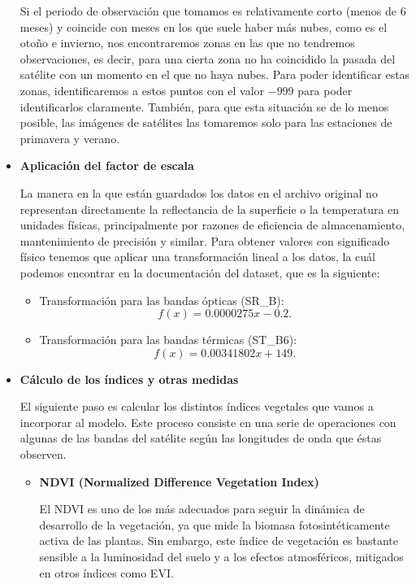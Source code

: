 \begin{itemize}
    Si el periodo de observación que tomamos es relativamente corto (menos de 6 meses) y coincide con meses en los que suele haber más nubes, como es el otoño e invierno, nos encontraremos zonas en las que no tendremos observaciones, es decir, para una cierta zona no ha coincidido la pasada del satélite con un momento en el que no haya nubes. Para poder identificar estas zonas, identificaremos a estos puntos con el valor $-999$ para poder identificarlos claramente. También, para que esta situación se de lo menos posible, las imágenes de satélites las tomaremos solo para las estaciones de primavera y verano. 

    \item \textbf{Aplicación del factor de escala}

    La manera en la que están guardados los datos en el archivo original no representan directamente la reflectancia de la superficie o la temperatura en unidades físicas, principalmente por razones de eficiencia de almacenamiento, mantenimiento de precisión y similar. Para obtener valores con significado físico tenemos que aplicar una transformación lineal a los datos, la cuál podemos encontrar en la documentación del dataset, que es la siguiente:
    \begin{itemize}
        \item Transformación para las bandas ópticas (SR\_B):
        \[
        f(x) = 0.0000275x - 0.2.
        \]
        \item Transformación para las bandas térmicas (ST\_B6):
        \[
        f(x) = 0.00341802x + 149.
        \]
    \end{itemize}
    \item \textbf{Cálculo de los índices y otras medidas}\label{sec:indices}
    
    El siguiente paso es calcular los distintos índices vegetales que vamos a incorporar al modelo. Este proceso consiste en una serie de operaciones con algunas de las bandas del satélite según las longitudes de onda que éstas observen.

    \begin{itemize}
        \item \textbf{NDVI (Normalized Difference Vegetation Index)} \cite{eos_indices_vegetacion}
        
        El NDVI es uno de los más adecuados para seguir la dinámica de desarrollo de la vegetación, ya que mide la biomasa fotosintéticamente activa de las plantas. Sin embargo, este índice de vegetación es bastante sensible a la luminosidad del suelo y a los efectos atmosféricos, mitigados en otros índices como EVI.
        

\end{itemize}
\end{itemize}
